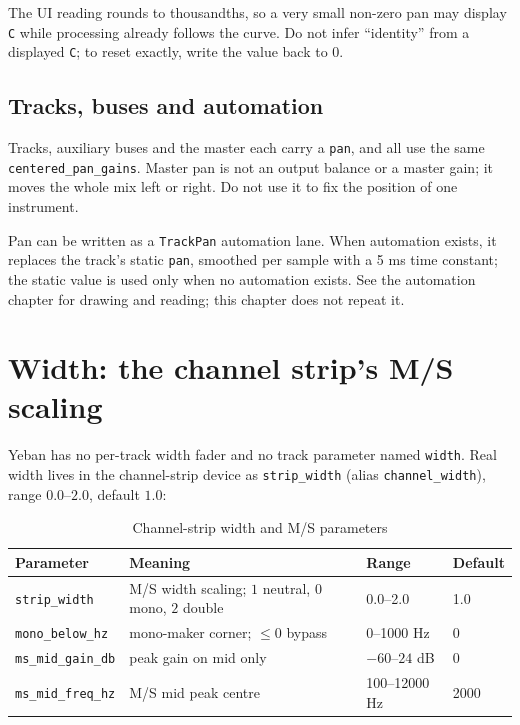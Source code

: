 The UI reading rounds to thousandths, so a very small non-zero pan may display \texttt{C} while processing already follows the curve. Do not infer ``identity'' from a displayed \texttt{C}; to reset exactly, write the value back to $0$.

\subsection{Tracks, buses and automation}

Tracks, auxiliary buses and the master each carry a \texttt{pan}, and all use the same \texttt{centered\_pan\_gains}. Master pan is not an output balance or a master gain; it moves the whole mix left or right. Do not use it to fix the position of one instrument.

Pan can be written as a \texttt{TrackPan} automation lane. When automation exists, it replaces the track's static \texttt{pan}, smoothed per sample with a 5 ms time constant; the static value is used only when no automation exists. See the automation chapter for drawing and reading; this chapter does not repeat it.

\section{Width: the channel strip's M/S scaling}

Yeban has no per-track width fader and no track parameter named \texttt{width}. Real width lives in the channel-strip device as \texttt{strip\_width} (alias \texttt{channel\_width}), range $0.0$--$2.0$, default $1.0$:

\begin{table}[htbp]
\centering
\small
\begin{tabular}{@{}llll@{}}
\hline
Parameter & Meaning & Range & Default \\
\hline
\texttt{strip\_width} & M/S width scaling; $1$ neutral, $0$ mono, $2$ double & 0.0--2.0 & 1.0 \\
\texttt{mono\_below\_hz} & mono-maker corner; $\le0$ bypass & 0--1000 Hz & 0 \\
\texttt{ms\_mid\_gain\_db} & peak gain on mid only & $-60$--$24$ dB & 0 \\
\texttt{ms\_mid\_freq\_hz} & M/S mid peak centre & 100--12000 Hz & 2000 \\
\hline
\end{tabular}
\caption{Channel-strip width and M/S parameters}
\label{tab:strip-width-params}
\end{table}

